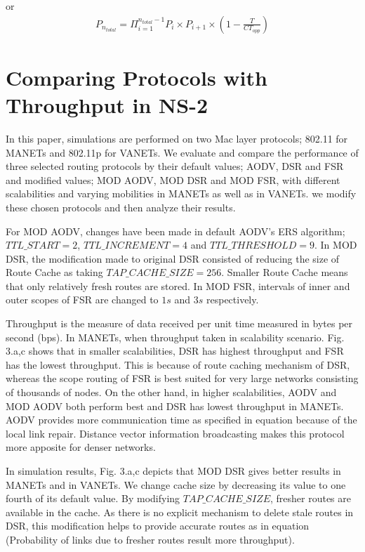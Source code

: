 \documentclass[journal]{IEEEtran}
\begin{document}
or
\begin{eqnarray}
P_{n_{total}}=\Pi_{i=1}^{n_{total}-1}P_{i}\times P_{i+1}\times (1-\frac{T}{CT_{opp}})
\end{eqnarray}


\section{Comparing Protocols with Throughput in NS-2}
In this paper, simulations are performed on two Mac layer protocols; 802.11 for MANETs and 802.11p for VANETs. We evaluate and compare the performance of three selected routing protocols by their default values; AODV, DSR and FSR and modified values; MOD AODV, MOD DSR and MOD FSR, with different scalabilities and varying mobilities in MANETs as well as in VANETs. we modify these chosen protocols and then analyze their results.

For MOD AODV, changes have been made in default AODV's ERS algorithm; $TTL\_START=2$, $TTL\_INCREMENT=4$ and $TTL\_THRESHOLD=9$. In MOD DSR, the modification made to original DSR consisted of reducing the size of Route Cache as taking $TAP\_CACHE\_SIZE=256$. Smaller Route Cache means that only relatively fresh routes are stored. In MOD FSR, intervals of inner and outer scopes of FSR are changed to $1s$ and $3s$ respectively.











Throughput is the measure of data received per unit time measured in bytes per second (bps). In MANETs, when throughput taken in scalability scenario.
Fig. 3.a,c shows that in smaller scalabilities, DSR has  highest throughput and FSR has the lowest throughput. This is because of route caching mechanism of DSR, whereas the scope routing of FSR is best suited for very large networks consisting of thousands of nodes. On the other hand, in higher scalabilities, AODV and MOD AODV both perform best and DSR has lowest throughput in MANETs. AODV provides more communication time as specified in equation because of the local link repair. Distance vector information broadcasting makes this protocol more apposite for denser networks.

In simulation results, Fig. 3.a,c depicts that MOD DSR gives better results in MANETs and in VANETs. We change cache size by decreasing its value to one fourth of its default value. By modifying $TAP\_ CACHE\_ SIZE$, fresher routes are available in the cache. As there is no explicit mechanism to delete stale routes in DSR, this modification helps to provide accurate routes as in equation (Probability of links due to fresher routes result more throughput).
\end{document}
